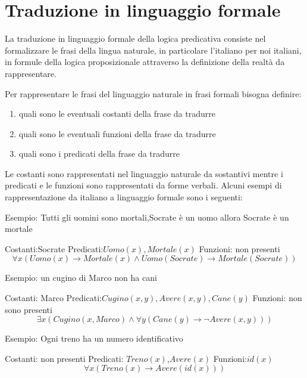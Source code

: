 \section{Traduzione in linguaggio formale}
La traduzione in linguaggio formale della logica predicativa consiste nel formalizzare
le frasi della lingua naturale, in particolare l'italiano per noi italiani, in
formule della logica proposizionale attraverso la definizione della realtà da rappresentare.

Per rappresentare le frasi del linguaggio naturale in frasi formali bisogna definire:
\begin{enumerate}
    \item quali sono le eventuali costanti della frase da tradurre
    \item quali sono le eventuali funzioni della frase da tradurre
    \item quali sono i predicati della frase da tradurre
\end{enumerate}

Le costanti sono rappresentati nel linguaggio naturale da sostantivi mentre i
predicati e le funzioni sono rappresentati da forme verbali.
Alcuni esempi di rappresentazione da italiano a linguaggio formale sono i seguenti:

Esempio: Tutti gli uomini sono mortali,Socrate è un uomo allora Socrate è un mortale

Costanti:Socrate \newline
Predicati:$Uomo(x),Mortale(x)$ \newline
Funzioni: non presenti \newline
\begin{equation*}
\forall x (Uomo(x) \rightarrow Mortale(x) \land Uomo(Socrate) \rightarrow Mortale(Socrate))
\end{equation*}

Esempio: un cugino di Marco non ha cani

Costanti: Marco
Predicati:$Cugino(x,y),Avere(x,y),Cane(y)$
Funzioni: non sono presenti
\begin{equation*}
\exists x (Cugino(x,Marco) \land \forall y (Cane(y) \rightarrow \neg Avere(x,y)))
\end{equation*}

Esempio: Ogni treno ha un numero identificativo

Costanti: non presenti
Predicati: $Treno(x)$,$Avere(x)$
Funzioni:$id(x)$
\begin{equation*}
\forall x (Treno(x) \rightarrow Avere(id(x)))
\end{equation*}

